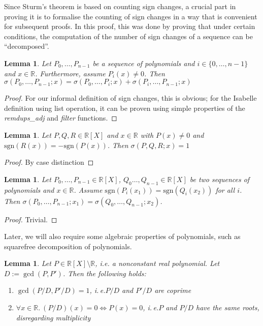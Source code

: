 \documentclass[11pt,a4paper,oneside]{article}
\newtheorem{lemma}[definition]{Lemma}
\newcommand{\RR}{\mathbb{R}}
\newcommand{\sgn}{\mathrm{sgn}}
\newcommand{\ie}{i.\,e.\xspace}
\begin{document}
Since Sturm's theorem is based on counting sign changes, a crucial part in proving it is to formalise the counting of sign changes in a way that is convenient for subsequent proofs. In this proof, this was done by proving that under certain conditions, the computation of the number of sign changes of a sequence can be \enquote{decomposed}.

\begin{lemma}\label{thm:sign_changes_distrib}
Let $P_0, \ldots, P_{n-1}$ be a sequence of polynomials and $i\in\{0,\ldots,n-1\}$ and $x\in\RR$. Furthermore, assume $P_i(x) \neq 0$. Then $\sigma(P_0,\ldots,P_{n-1}; x) = \sigma(P_0,\ldots,P_i; x)+\sigma(P_i,\ldots,P_{n-1}; x)$
\end{lemma}
\begin{proof}
For our informal definition of sign changes, this is obvious; for the Isabelle definition using list operation, it can be proven using simple properties of the \emph{remdups\_adj} and \emph{filter} functions.
\end{proof}\vskip3mm

\begin{lemma}\label{thm:sign_changes_triple}
Let $P,Q,R\in\RR[X]$ and $x\in\RR$ with $P(x)\neq 0$ and $\sgn(R(x)) = -\sgn(P(x))$. Then $\sigma(P,Q,R; x) = 1$
\end{lemma}
\begin{proof}
By case distinction
\end{proof}\vskip3mm

\begin{lemma}\label{thm:same_signs}
Let $P_0,\ldots,P_{n-1}\in\RR[X]$, $Q_0\ldots,Q_{n-1}\in\RR[X]$ be two sequences of polynomials and $x\in\RR$. Assume $\sgn(P_i(x_1))=\sgn(Q_i(x_2))$ for all $i$. Then $\sigma(P_0,\ldots,P_{n-1};x_1)=\sigma(Q_0,\ldots,Q_{n-1};x_2)$.
\end{lemma}
\begin{proof}
Trivial.
\end{proof}\vskip3mm

Later, we will also require some algebraic properties of polynomials, such as squarefree decomposition of polynomials. 
\begin{lemma}\label{thm:squarefree}
Let $P \in \RR[X]\setminus \RR$, i.e. a nonconstant real polynomial. Let $D:=\gcd(P,P')$. Then the following holds:
\begin{enumerate}
\item $\gcd(P/D, P'/D) = 1$, \ie $P/D$ and $P'/D$ are coprime
\item $\forall x\in\RR.\ (P/D)(x)=0 \Longleftrightarrow P(x)=0$, \ie $P$ and $P/D$ have the same roots, disregarding multiplicity
\end{enumerate}
\end{lemma}\vskip3mm
\end{document}
